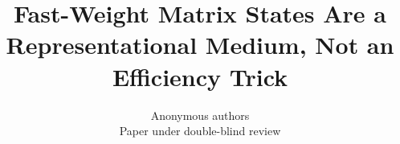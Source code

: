 \documentclass{article} %
\title{Fast-Weight Matrix States Are a Representational Medium, Not an
Efficiency Trick}
\author{Anonymous authors\\
Paper under double-blind review}
\begin{document}
\maketitle

\begin{abstract}

\end{abstract}






%









\appendix


\end{document}
